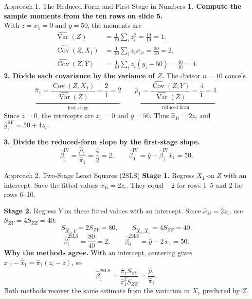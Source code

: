 \documentclass[10pt,aspectratio=169]{beamer}
\newcommand{\Cov}{\operatorname{Cov}}
\newcommand{\Var}{\operatorname{Var}}
\begin{document}
\begin{frame}{Approach 1. The Reduced Form and First Stage in Numbers}
\small
\setlength{\abovedisplayskip}{5pt}
\setlength{\belowdisplayskip}{5pt}
\setlength{\abovedisplayshortskip}{4pt}
\setlength{\belowdisplayshortskip}{4pt}
\textbf{1. Compute the sample moments from the ten rows on slide 5.}\\
With $\bar z=\bar x_1=0$ and $\bar y=50$, the moments are
\[
\begin{aligned}
\widehat{\Var}(Z)&=\frac{1}{10}\sum\nolimits_i z_i^2=\frac{10}{10}=1,\\
\widehat{\Cov}(Z,X_1)&=\frac{1}{10}\sum\nolimits_i z_i x_{1i}=\frac{20}{10}=2,\\
\widehat{\Cov}(Z,Y)&=\frac{1}{10}\sum\nolimits_i z_i(y_i-50)=\frac{40}{10}=4.
\end{aligned}
\]
\textbf{2. Divide each covariance by the variance of $Z$.} The divisor $n=10$ cancels.
\[
\underbrace{\hat\pi_1=\frac{\widehat{\Cov}(Z,X_1)}{\widehat{\Var}(Z)}
=\frac{2}{1}=2}_{\text{first stage}}
\qquad
\underbrace{\hat\rho_1=\frac{\widehat{\Cov}(Z,Y)}{\widehat{\Var}(Z)}
=\frac{4}{1}=4}_{\text{reduced form}}.
\]
Since $\bar z=0$, the intercepts are $\bar x_1=0$ and $\bar y=50$. Thus $\widehat x_{1i}=2z_i$ and $\hat y_i^{\mathrm{RF}}=50+4z_i$.
\smallskip

\textbf{3. Divide the reduced-form slope by the first-stage slope.}
\[
\boxed{\hat\beta_1^{\mathrm{IV}}=\frac{\hat\rho_1}{\hat\pi_1}=\frac{4}{2}=2},
\qquad
\hat\beta_0^{\mathrm{IV}}=\bar y-\hat\beta_1^{\mathrm{IV}}\bar x_1=50.
\]
\end{frame}

\begin{frame}{Approach 2. Two-Stage Least Squares (2SLS)}
\textbf{Stage 1.} Regress $X_1$ on $Z$ with an intercept. Save the fitted values
$\widehat x_{1i}=2z_i$. They equal $-2$ for rows 1--5 and $2$ for rows 6--10.
\medskip

\textbf{Stage 2.} Regress $Y$ on these fitted values with an intercept.
Since $\widehat x_{1i}=2z_i$, use $S_{ZY}=4 S_{ZZ}=40$:
\[
S_{\widehat X_1,Y}=2 S_{ZY}=80,
\qquad S_{\widehat X_1,\widehat X_1}=4 S_{ZZ}=40.
\]
\[
\boxed{\hat\beta_1^{\mathrm{2SLS}}=\frac{80}{40}=2},
\qquad
\hat\beta_0^{\mathrm{2SLS}}=\bar y-2\,\overline{\widehat x}_1=50.
\]
\textbf{Why the methods agree.} With an intercept, centering gives
$\widehat x_{1i}-\overline{\widehat x}_1=\hat\pi_1(z_i-\bar z)$, so
\[
\hat\beta_1^{\mathrm{2SLS}}
=\frac{\hat\pi_1 S_{ZY}}{\hat\pi_1^2S_{ZZ}}
=\frac{\hat\rho_1}{\hat\pi_1}.
\]
Both methods recover the same estimate from the variation in $X_1$ predicted by $Z$.
\end{frame}
\end{document}
